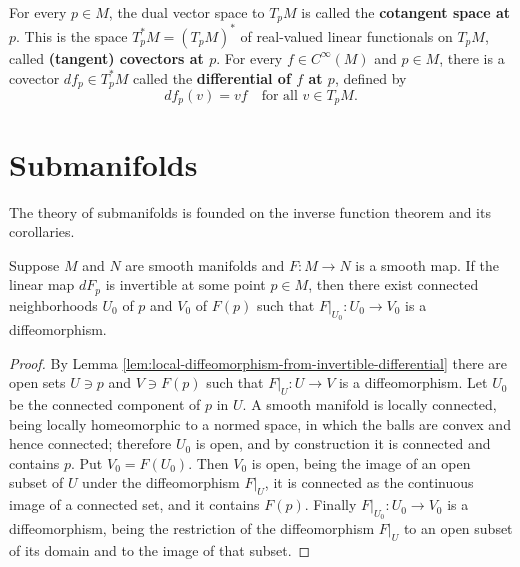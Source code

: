 For every $p \in M$, the dual vector space to $T_p M$ is called the \textbf{cotangent space at $p$}. This is the space $T_p^* M = (T_p M)^*$ of real-valued linear functionals on $T_p M$, called \textbf{(tangent) covectors at $p$}. For every $f \in C^\infty(M)$ and $p \in M$, there is a covector $df_p \in T_p^* M$ called the \textbf{differential of $f$ at $p$}, defined by
\begin{equation}
df_p(v) = vf \quad \text{for all } v \in T_p M.
\tag{A.4}
\end{equation}

\section{Submanifolds}

The theory of submanifolds is founded on the inverse function theorem and its corollaries.

\begin{theorem}
\label{thm:inverse-function-theorem-manifolds}
\leanok
{}
Suppose $M$ and $N$ are smooth manifolds and $F: M \to N$ is a smooth map. If the linear map $dF_p$ is invertible at some point $p \in M$, then there exist connected neighborhoods $U_0$ of $p$ and $V_0$ of $F(p)$ such that $F|_{U_0}: U_0 \to V_0$ is a diffeomorphism.
\end{theorem}

\begin{proof}
\leanok
{}
By Lemma \ref{lem:local-diffeomorphism-from-invertible-differential} there are open sets $U \ni p$ and $V \ni F(p)$ such that $F|_U : U \to V$ is a diffeomorphism. Let $U_0$ be the connected component of $p$ in $U$. A smooth manifold is locally connected, being locally homeomorphic to a normed space, in which the balls are convex and hence connected; therefore $U_0$ is open, and by construction it is connected and contains $p$. Put $V_0 = F(U_0)$. Then $V_0$ is open, being the image of an open subset of $U$ under the diffeomorphism $F|_U$, it is connected as the continuous image of a connected set, and it contains $F(p)$. Finally $F|_{U_0} : U_0 \to V_0$ is a diffeomorphism, being the restriction of the diffeomorphism $F|_U$ to an open subset of its domain and to the image of that subset.
\end{proof}

